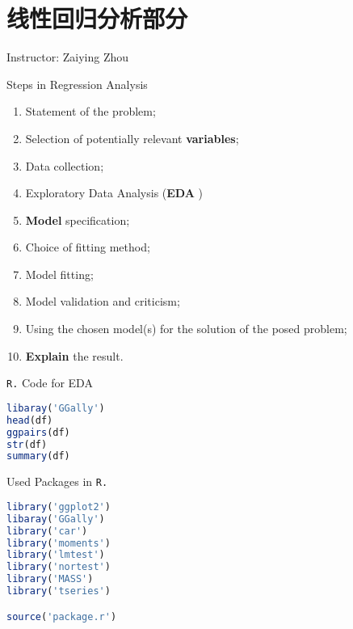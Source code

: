 \chapter{线性回归分析部分}\label{SecLinearRegressionAnalysis}
\begin{center}
    Instructor: Zaiying Zhou
\end{center}
\begin{point}
    Steps in Regression Analysis
\end{point}

\begin{enumerate}[topsep=2pt,itemsep=2pt]
    \item Statement of the problem;
    \item Selection of potentially relevant \textbf{variables};
    \item Data collection;
    \item Exploratory Data Analysis (\textbf{EDA} )
    \item \textbf{Model} specification;
    \item Choice of fitting method;
    \item Model fitting;
    \item Model validation and criticism;
    \item Using the chosen model(s) for the solution of the posed problem;
    \item \textbf{Explain} the result.
\end{enumerate}

    \lstinline|R.| Code for EDA
\begin{lstlisting}[language=R]
libaray('GGally')
head(df)
ggpairs(df)
str(df)
summary(df)
\end{lstlisting}



\begin{point}
    Used Packages in \lstinline|R.|
\begin{lstlisting}[language=R]
library('ggplot2')
libaray('GGally')
library('car')
library('moments')
library('lmtest')
library('nortest')
library('MASS')
library('tseries')

source('package.r')
\end{lstlisting}

\end{point}


